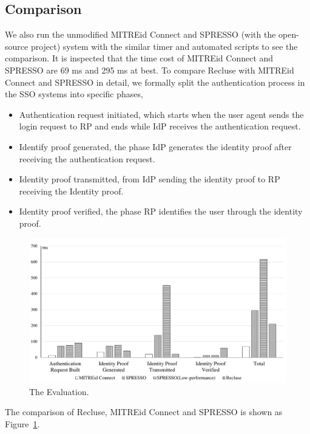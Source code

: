 

\subsection{Comparison}
We also run the unmodified MITREid Connect and SPRESSO (with the open-source project) system with the similar timer and automated scripts to see the comparison. 
It is inspected that the time cost of MITREid Connect and SPRESSO are 69 ms and 295 ms at best. To compare Recluse with MITREid Connect and SPRESSO in detail, we formally split the authentication process in the SSO systems into specific phases, 
\begin{itemize}
    \item  Authentication request initiated, which starts when the user agent sends the login request to RP and ends while IdP receives the authentication request.
    \item  Identify proof generated, the phase IdP generates the identity proof after receiving the authentication request.
    \item  Identity proof transmitted, from IdP sending the identity proof to RP receiving the Identity proof.
    \item  Identity proof verified, the phase RP identifies the user through the identity proof. 
\end{itemize}

\begin{figure}
  \centering
  \includegraphics[width=\linewidth]{fig/evaluation2.pdf}
  \caption{The Evaluation.}
  \label{fig:evaluation}
\end{figure}
The comparison of Recluse, MITREid Connect and SPRESSO is shown as Figure~\ref{fig:evaluation}. 


